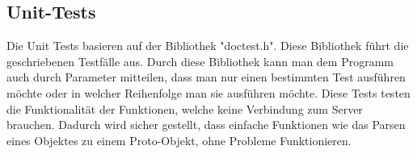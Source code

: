 
\subsection{Unit-Tests}
Die Unit Tests basieren auf der Bibliothek "doctest.h". Diese Bibliothek führt die geschriebenen Testfälle aus. Durch diese Bibliothek kann man dem Programm auch durch Parameter mitteilen, dass man nur einen bestimmten Test ausführen möchte oder in welcher Reihenfolge man sie ausführen möchte. Diese Tests testen die Funktionalität der Funktionen, welche keine Verbindung zum Server brauchen. Dadurch wird sicher gestellt, dass einfache Funktionen wie das Parsen eines Objektes zu einem Proto-Objekt, ohne Probleme Funktionieren.